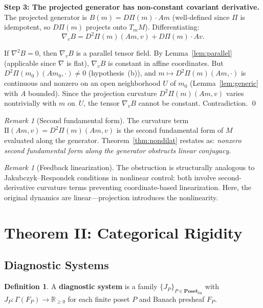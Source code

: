 \documentclass[12pt,a4paper]{amsart}
\theoremstyle{plain}
\theoremstyle{definition}
\newtheorem{definition}[theorem]{Definition}
\theoremstyle{remark}
\newtheorem{remark}[theorem]{Remark}
\newcommand{\R}{\mathbb{R}}
\begin{document}
\medskip
\noindent\textbf{Step 3: The projected generator has non-constant
covariant derivative.}
The projected generator is $B(m) = D\Pi(m) \cdot Am$ (well-defined
since $\Pi$ is idempotent, so $D\Pi(m)$ projects onto $T_m M$).
Differentiating:
\[
  \nabla_v B = D^2\Pi(m)(Am, v) + D\Pi(m) \cdot Av.
\]

If $\nabla^2 B = 0$, then $\nabla_v B$ is a parallel tensor field. By
Lemma~\ref{lem:parallel} (applicable since $\nabla$ is flat),
$\nabla_v B$ is constant in affine coordinates. But
$D^2\Pi(m_0)(Am_0, \cdot) \neq 0$ (hypothesis~(b)), and
$m \mapsto D^2\Pi(m)(Am, \cdot)$ is continuous and nonzero on an open
neighborhood $U$ of $m_0$ (Lemma~\ref{lem:generic} with $A$ bounded).
Since the projection curvature $D^2\Pi(m)(Am, v)$ varies nontrivially
with $m$ on~$U$, the tensor $\nabla_v B$ cannot be constant.
Contradiction. \qed

\begin{remark}[Second fundamental form]
The curvature term $\mathrm{II}(Am, v) = D^2\Pi(m)(Am, v)$ is the
second fundamental form of $M$ evaluated along the generator.
Theorem~\ref{thm:nondilat} restates as: \emph{nonzero second
fundamental form along the generator obstructs linear conjugacy.}
\end{remark}

\begin{remark}[Feedback linearization]
The obstruction is structurally analogous to Jakubczyk--Respondek
conditions \cite{JR80} in nonlinear control: both involve
second-derivative curvature terms preventing coordinate-based
linearization. Here, the original dynamics are linear---projection
introduces the nonlinearity.
\end{remark}



\section{Theorem II: Categorical Rigidity}\label{sec:thm2}

\subsection{Diagnostic Systems}

\begin{definition}\label{def:diagnostic}
A \textbf{diagnostic system} is a family
$\{J_P\}_{P \in \mathbf{Poset}_{\mathrm{fin}}}$ with
$J_P\colon \Gamma(F_P) \to \R_{\geq 0}$ for each finite poset $P$
and Banach presheaf $F_P$.
\end{definition}
\end{document}
